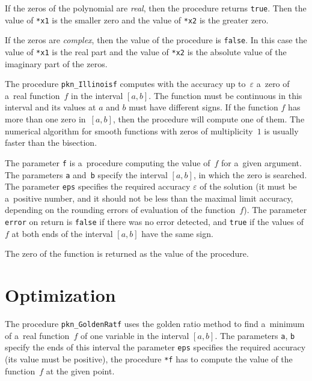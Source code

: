 If the zeros of the polynomial are \emph{real}, then the procedure
returns \texttt{true}. Then the value of \texttt{*x1} is the smaller zero
and the value of \texttt{*x2} is the greater zero.

If the zeros are \emph{complex}, then the value of the procedure
is \texttt{false}. In this case the value of \texttt{*x1} is the real part
and the value of \texttt{*x2} is the absolute value of the imaginary
part of the zeros.

\vspace{\bigskipamount}
\begin{sloppypar}
The procedure \texttt{pkn\_Illinoisf} computes with the accuracy
up to~$\varepsilon$ a~zero of a~real function~$f$ in the interval $[a,b]$.
The function must be continuous in this interval and its values at
$a$ and $b$ must have different signs. If the function $f$ has more than one
zero in~$[a,b]$, then the procedure will compute one of them. The numerical algorithm
for smooth functions with zeros of multiplicity~$1$ is usually faster
than the bisection.
\end{sloppypar}

The parameter \texttt{f} is a~procedure computing the value of~$f$ for
a~given argument. The parameters \texttt{a} and~\texttt{b} specify the interval
$[a,b]$, in which the zero is searched. The parameter \texttt{eps}
specifies the required accuracy $\varepsilon$ of the solution
(it must be a~positive number, and it should not be less than
the maximal limit accuracy, depending on the rounding errors
of evaluation of the function~$f$). The parameter \texttt{error} on return
is \texttt{false} if there was no error detected, and \texttt{true}
if the values of~$f$ at both ends of the interval $[a,b]$ have the same sign.

The zero of the function is returned as the value of the procedure.


\newpage
\section{Optimization}

\hspace*{\parindent}%
The procedure \texttt{pkn\_GoldenRatf} uses the golden ratio method to find
a~minimum of a~real function~$f$ of one variable in the interval $[a,b]$.
The parameters \texttt{a}, \texttt{b} specify the ends of this interval
the parameter \texttt{eps} specifies the required accuracy (its value must be
positive), the procedure \texttt{*f} has to compute the value of the
function~$f$ at the given point.

